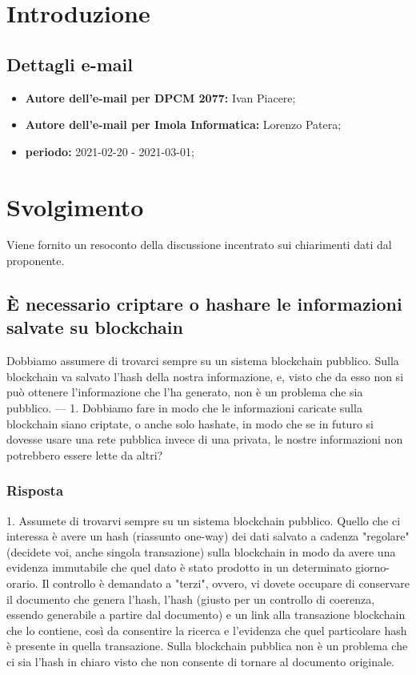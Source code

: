 \section*{Introduzione}
\subsection*{Dettagli e-mail}
\begin{itemize}
	\item \textbf{Autore dell'e-mail per DPCM 2077:} Ivan Piacere;
	\item \textbf{Autore dell'e-mail per Imola Informatica:} Lorenzo Patera;
	\item \textbf{periodo:} 2021-02-20 - 2021-03-01;
\end{itemize}

\section*{Svolgimento}
Viene fornito un resoconto della discussione incentrato sui chiarimenti dati dal proponente.


\subsection*{È necessario criptare o hashare le informazioni salvate su blockchain}
Dobbiamo assumere di trovarci sempre su un sistema blockchain pubblico.
Sulla blockchain va salvato l'hash della nostra informazione, e, visto che da esso non si può ottenere l'informazione che l'ha generato, non è un problema che sia pubblico.
---
1. Dobbiamo fare in modo che le informazioni caricate sulla blockchain siano criptate, o anche solo hashate, in modo che se in futuro si dovesse usare una rete pubblica invece di una privata, le nostre informazioni non potrebbero essere lette da altri?

\subsubsection*{Risposta}
1. Assumete di trovarvi sempre su un sistema blockchain pubblico. Quello che ci interessa è avere un hash (riassunto one-way) dei dati salvato a cadenza "regolare" (decidete voi, anche singola transazione) sulla blockchain in modo da avere una evidenza immutabile che quel dato è stato prodotto in un determinato giorno-orario. Il controllo è demandato a "terzi", ovvero, vi dovete occupare di conservare il documento che genera l'hash, l'hash (giusto per un controllo di coerenza, essendo generabile a partire dal documento) e un link alla transazione blockchain che lo contiene, così da consentire la ricerca e l'evidenza che quel particolare hash è presente in quella transazione. Sulla blockchain pubblica non è un problema che ci sia l'hash in chiaro visto che non consente di tornare al documento originale.



